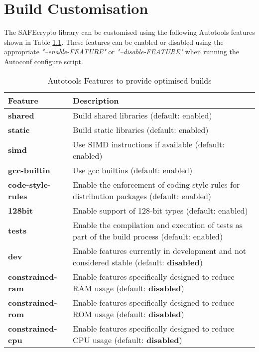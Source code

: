 \chapter{Build Customisation}

The SAFEcrypto library can be customised using the following Autotools features shown in Table \ref{table:autotools_scheme_switches}. These features can be enabled or disabled using the appropriate \textit{"--enable-FEATURE"} or \textit{"--disable-FEATURE"} when running the Autoconf configure script.

\begin{table}[h]
\caption{Autotools Features to provide optimised builds}
\label{table:autotools_scheme_switches}
\begin{tabularx}{\textwidth}{l p{13cm}}
\toprule
\textbf{Feature} &\textbf{Description}  \\
\midrule
\textbf{shared} &Build shared libraries (default: enabled) \\
\midrule
\textbf{static} &Build static libraries (default: enabled) \\
\midrule
\textbf{simd} &Use SIMD instructions if available (default: enabled) \\
\midrule
\textbf{gcc-builtin} &Use gcc builtins (default: enabled) \\
\midrule
\textbf{code-style-rules} &Enable the enforcement of coding style rules for distribution packages (default: enabled) \\
\midrule
\textbf{128bit} &Enable support of 128-bit types (default: enabled) \\
\midrule
\textbf{tests} &Enable the compilation and execution of tests as part of the build process (default: enabled) \\
\midrule
\textbf{dev} &Enable features currently in development and not considered stable (default: \textbf{disabled}) \\
\midrule
\textbf{constrained-ram} &Enable features specifically designed to reduce RAM usage (default: \textbf{disabled}) \\
\midrule
\textbf{constrained-rom} &Enable features specifically designed to reduce ROM usage (default: \textbf{disabled}) \\
\midrule
\textbf{constrained-cpu} &Enable features specifically designed to reduce CPU usage (default: \textbf{disabled}) \\
\bottomrule
\end{tabularx}
\end{table}

